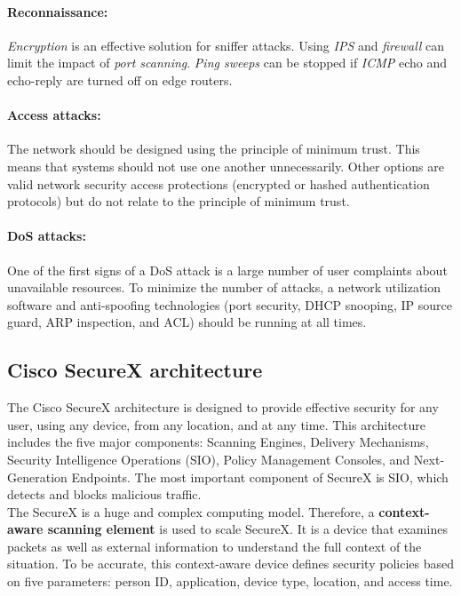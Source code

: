 \paragraph{Reconnaissance:} \emph{Encryption} is an effective solution for sniffer attacks. Using \emph{IPS} and \emph{firewall} can limit the impact of \emph{port scanning}. \emph{Ping sweeps} can be stopped if \emph{ICMP} echo and echo-reply are turned off on edge routers. 

\paragraph{Access attacks:} The network should be designed using the principle of minimum trust. This means that systems should not use one another unnecessarily. Other options are valid network security access protections (encrypted or hashed authentication protocols) but do not relate to the principle of minimum trust.

\paragraph{DoS attacks:} One of the first signs of a DoS attack is a large number of user complaints about unavailable resources. To minimize the number of attacks, a network utilization software and anti-spoofing technologies (port security, DHCP snooping, IP source guard, ARP inspection, and ACL) should be running at all times. 

\subsection{Cisco SecureX architecture}

The Cisco SecureX architecture is designed to provide effective security for any user, using any device, from any location, and at any time. This architecture includes the five major components: Scanning Engines, Delivery Mechanisms, Security Intelligence Operations (SIO), Policy Management Consoles, and Next-Generation Endpoints. The most important component of SecureX is SIO, which detects and blocks malicious traffic.\\

The SecureX is a huge and complex computing model. Therefore, a \textbf{context-aware scanning element} is used to scale SecureX. It is a device that examines packets as well as external information to understand the full context of the situation. To be accurate, this context-aware device defines security policies based on five parameters: person ID, application, device type, location, and access time.\\

